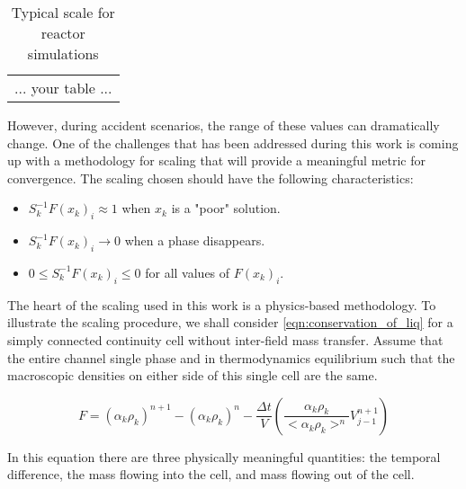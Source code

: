 \begin{table}[ht]
\centering
\begin{tabular}{|l|}
... your table ...
\end{tabular}
\caption{Typical scale for reactor simulations}
\label{tab:scaling_units_scales}
\end{table}

However, during accident scenarios, the range of these values can dramatically change.
One of the challenges that has been addressed during this work is coming up with a methodology for scaling that will provide a meaningful metric for convergence.
The scaling chosen should have the following characteristics:
\begin{itemize}
\item{$S^{-1}_k F(x_k)_i \approx 1$ when $x_k$ is a "poor" solution.}
\item{$S^{-1}_k F(x_k)_i \rightarrow 0$ when a phase disappears.}
\item{$0 \leq S^{-1}_k F(x_k)_i \leq 0 $ for all values of $F(x_k)_i$.}
\end{itemize}

The heart of the scaling used in this work is a physics-based methodology.
To illustrate the scaling procedure, we shall consider \eqref{eqn:conservation_of_liq} for a simply connected continuity cell without inter-field mass transfer.
Assume that the entire channel single phase and in thermodynamics equilibrium such that the macroscopic densities on either side of this single cell are the same.

\begin{equation}
F = \left(\alpha_k \rho_k\right)^{n+1} - \left( \alpha_k \rho_k \right)^n - \frac{\Delta t}{V} \left( \frac{\alpha_k \rho_k }{<\alpha_k \rho_k>^n} V^{n+1}_{j-1} \right)
\end{equation}

In this equation there are three physically meaningful quantities: the temporal difference, the mass flowing into the cell, and mass flowing out of the cell.

